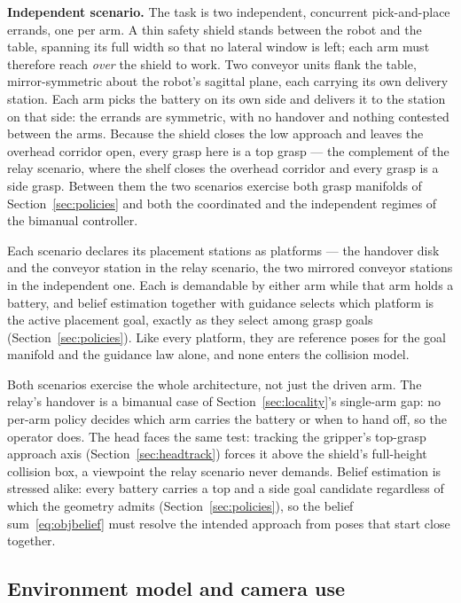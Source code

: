 \documentclass[12pt,a4paper,twoside,openright]{report}
\begin{document}
\textbf{Independent scenario.} The task is two independent, concurrent pick-and-place errands, one per arm. A thin safety shield stands between the robot and the table, spanning its full width so that no lateral window is left; each arm must therefore reach \emph{over} the shield to work. Two conveyor units flank the table, mirror-symmetric about the robot's sagittal plane, each carrying its own delivery station. Each arm picks the battery on its own side and delivers it to the station on that side: the errands are symmetric, with no handover and nothing contested between the arms. Because the shield closes the low approach and leaves the overhead corridor open, every grasp here is a top grasp --- the complement of the relay scenario, where the shelf closes the overhead corridor and every grasp is a side grasp. Between them the two scenarios exercise both grasp manifolds of Section~\ref{sec:policies} and both the coordinated and the independent regimes of the bimanual controller.

Each scenario declares its placement stations as platforms --- the handover disk and the conveyor station in the relay scenario, the two mirrored conveyor stations in the independent one. Each is demandable by either arm while that arm holds a battery, and belief estimation together with guidance selects which platform is the active placement goal, exactly as they select among grasp goals (Section~\ref{sec:policies}). Like every platform, they are reference poses for the goal manifold and the guidance law alone, and none enters the collision model.

Both scenarios exercise the whole architecture, not just the driven arm. The relay's handover is a bimanual case of Section~\ref{sec:locality}'s single-arm gap: no per-arm policy decides which arm carries the battery or when to hand off, so the operator does. The head faces the same test: tracking the gripper's top-grasp approach axis (Section~\ref{sec:headtrack}) forces it above the shield's full-height collision box, a viewpoint the relay scenario never demands. Belief estimation is stressed alike: every battery carries a top and a side goal candidate regardless of which the geometry admits (Section~\ref{sec:policies}), so the belief sum~\eqref{eq:objbelief} must resolve the intended approach from poses that start close together.

\subsection{Environment model and camera use}
\label{sec:studyenv}
\end{document}
